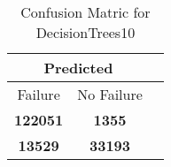 \begin{table}[] 
\caption{Confusion Matric for DecisionTrees10} 
\label{Table: Prediction Accuracy-DMDDecisionTrees10OnlySunEKF-resetReflectionEKF-top2perfectNoFailurePrediction-Reflection} 
\centering 
\begin{tabular} 
 {@{}ccc@{}} 
\toprule 
\multicolumn{2}{c}{\textbf{Predicted}}
 \\ \midrule 
\multicolumn{1}{|c|}{Failure} & 
\multicolumn{1}{c|}{No Failure}
 \\ \midrule 
\multicolumn{1}{|c|}{\color{green}\textbf{122051}} & 
\multicolumn{1}{c|}{\color{red}\textbf{1355}}
 \\ \midrule 
\multicolumn{1}{|c|}{\color{red}\textbf{13529}} & 
\multicolumn{1}{c|}{\color{green}\textbf{33193}}
 \\ \bottomrule 
\end{tabular} 
\end{table} 
